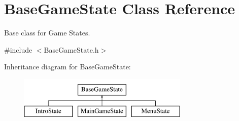 \hypertarget{classBaseGameState}{\section{Base\-Game\-State Class Reference}
\label{classBaseGameState}
}


Base class for Game States.  




{\ttfamily \#include $<$Base\-Game\-State.\-h$>$}

Inheritance diagram for Base\-Game\-State\-:\begin{figure}[H]
\begin{center}
\leavevmode
\includegraphics[height=2.000000cm]{classBaseGameState}
\end{center}
\end{figure}
